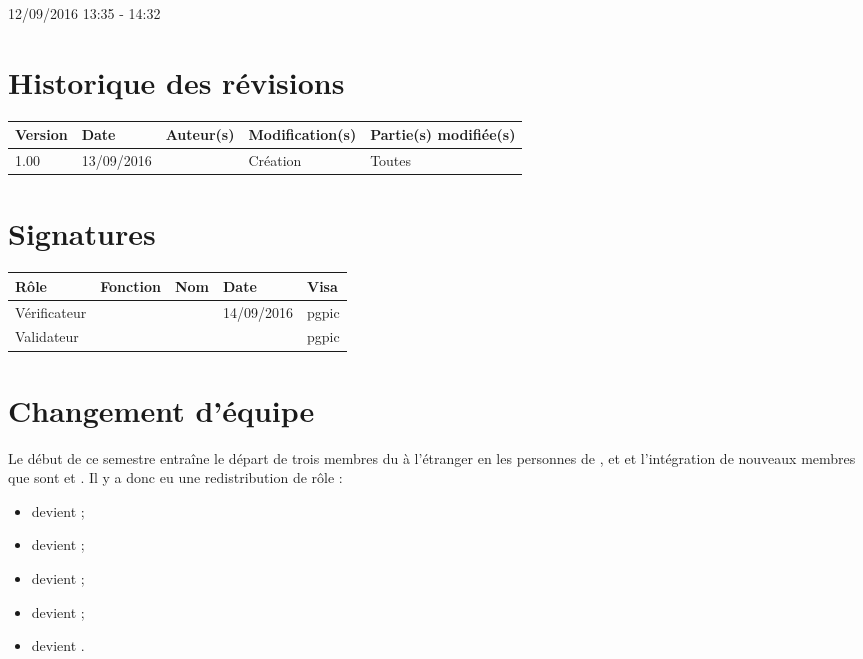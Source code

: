 \documentclass [a4paper] {article}
\begin{document}
12/09/2016			 				%
\hfill   
\hfill 	 13:35 - 14:32				%


\section*{Historique des révisions}
\begin{center}
			\begin{tabular}{| p{2.5cm} | p{3cm} | p{3cm} | p{3cm} | p{3.5cm} |}
				\hline
				\rowcolor{Gray}
				Version & Date & Auteur(s) & Modification(s) & Partie(s) modifiée(s)		 \\
				\hline
				1.00 & 13/09/2016 & \Kafui & Création & Toutes \\
		\hline		
			\end{tabular}
		\end{center}

\section*{Signatures}

		\begin{center}
			\begin{tabular}{| p{2.5cm} | p{4cm} | p{3cm} | p{3cm} | p{2.5cm} |}
				\hline
				\rowcolor{Gray}
				Rôle & Fonction & Nom & Date & Visa		 \\
				\hline
				Vérificateur & \RGC & \Melissa &  14/09/2016 & pgpic \\[30pt]
				\hline
				Validateur & \CP & \Pierre &  & pgpic \\[30pt]	
				\hline
			\end{tabular}
		\end{center}

\section{Changement d'équipe}
Le début de ce semestre entraîne le départ de trois membres du \PICCourt à l'étranger en les personnes de \Mathieu, \Michel{} et \Sergi{} et l'intégration de nouveaux membres que sont \Francois{} et \Juliana. Il y a donc eu une redistribution de rôle :
\begin{itemize}
\item \Pierre{} devient \CP;
\item \Francois{} devient \CPA;
\item \Kafui{} devient \RQ;
\item \Julie{} devient \RD;
\item \Melissa{} devient \RGC.
\end{itemize}
\end{document}
